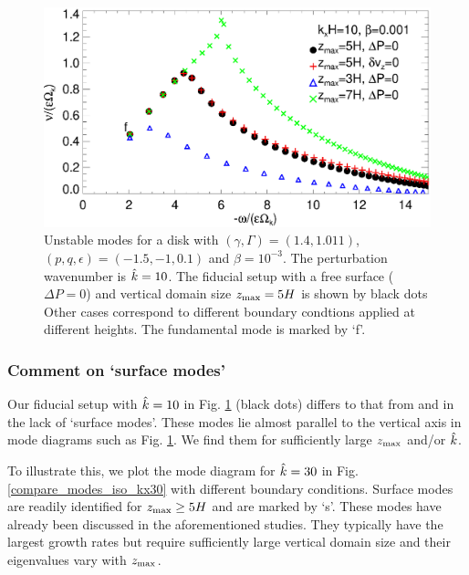 \begin{figure}
  \includegraphics[width=\linewidth]{figures/compare_modes_iso_kx10.ps}
  \caption{Unstable modes for a disk with 
    $(\gamma,\Gamma)=(1.4,1.011)$, $(p,q,\epsilon)=(-1.5,-1,0.1)$ and
    $\beta=10^{-3}$. The perturbation wavenumber is $\hat{k}=10$. 
    The fiducial setup with a free surface ($\Delta P=0$) and 
    vertical domain size $z_\mathrm{max}=5H$ is shown by black dots Other
    cases correspond to different boundary condtions applied at
    different heights. The fundamental mode is marked by `f'.   
    \label{compare_modes_iso_kx10} 
  }
\end{figure}

\subsubsection{Comment on `surface modes'} 
Our fiducial setup with $\hat{k}=10$ in 
Fig. \ref{compare_modes_iso_kx10} (black dots) differs to that from
\cite{nelson13} and \cite{mcnally14} in the lack of `surface modes'. 
These modes lie almost parallel to the vertical axis in mode 
diagrams such as Fig. \ref{compare_modes_iso_kx10}. We find them for 
sufficiently large $z_\mathrm{max}$ and/or $\hat{k}$. %

To illustrate this, we plot the mode diagram for $\hat{k}=30$ in  
Fig. \ref{compare_modes_iso_kx30} with different boundary 
conditions. Surface modes are readily identified for 
$z_\mathrm{max}\geq 5H$ and are marked by `s'. These modes have
already been discussed in the aforementioned studies. They typically
have the largest growth rates but require sufficiently large vertical
domain size and their eigenvalues vary with $z_\mathrm{max}$.  

